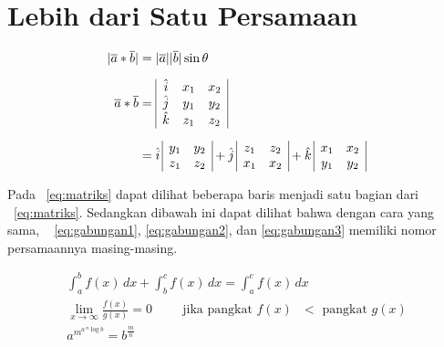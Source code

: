 \section{Lebih dari Satu Persamaan}
\label{sec:multiEqu}
\noindent \begin{align}\label{eq:matriks}	
	|\overline{a} * \overline{b}| &= |\overline{a}| |\overline{b}| \sin\theta 
	\\[0.2cm]
	\overline{a} * \overline{b} &=  
	\begin{array}{| c c c |}
		\hat{i} & x_{1} & x_{2} \\
		\hat{j} & y_{1} & y_{2} \\
		\hat{k} & z_{1} & z_{2} \\
	\end{array} \nonumber \\[0.2cm]
	&= \hat{i} \,
	\begin{array}{ | c c | }
		y_{1} & y_{2} \\
		z_{1} & z_{2} \\
	\end{array} 
	+ \hat{j} \,
	\begin{array}{ | c c | }
		z_{1} & z_{2} \\
		x_{1} & x_{2} \\
	\end{array} 
	+ \hat{k} \,	
	\begin{array}{ | c c | }
		x_{1} & x_{2} \\
		y_{1} & y_{2} \\
	\end{array}
	\nonumber
\end{align}

Pada \equ~\ref{eq:matriks} dapat dilihat beberapa baris menjadi satu bagian 
dari \equ~\ref{eq:matriks}. 
Sedangkan dibawah ini dapat dilihat bahwa dengan cara yang sama, \equ~
\ref{eq:gabungan1}, \ref{eq:gabungan2}, dan \ref{eq:gabungan3} memiliki nomor 
persamaannya masing-masing. 

\noindent \begin{align}\label{eq:gabungan1}	
	\int_{a}^{b} f(x)\, dx + \int_{b}^{c} f(x) \, dx = \int_{a}^{c} f(x) \, dx
	\\\label{eq:gabungan2}
	\lim_{x \to \infty} \frac{f(x)}{g(x)} = 0 \hspace{1cm} 
	\text{jika pangkat $f(x)$ $<$ pangkat $g(x)$} \\\label{eq:gabungan3}
	a^{m^{a \, ^{n}\log b }} = b^{\frac{m}{n}}
\end{align}
\fi
